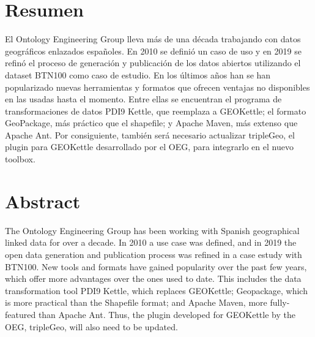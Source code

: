 \chapter*{Resumen}

El Ontology Engineering Group lleva más de una década trabajando con datos geográficos enlazados españoles. En
2010\cite{spanish} se definió un caso de uso y en 2019\cite{toolbox} se refinó el proceso de generación y
publicación de los datos abiertos utilizando el dataset BTN100 como caso de estudio. En los últimos años han se
han popularizado nuevas herramientas y formatos que ofrecen ventajas no disponibles en las usadas hasta el
momento. Entre ellas se encuentran el programa de transformaciones de datos PDI9 Kettle, que reemplaza a
GEOKettle; el formato GeoPackage, más práctico que el shapefile; y Apache Maven, más extenso que Apache Ant. Por
consiguiente, también será necesario actualizar tripleGeo, el plugin para GEOKettle desarrollado por el OEG,
para integrarlo en el nuevo toolbox. 

\newpage

\chapter*{Abstract}

The Ontology Engineering Group has been working with Spanish geographical linked data for over a decade. In
2010\cite{spanish} a use case was defined, and in 2019\cite{toolbox} the open data generation and publication
process was refined in a case estudy with BTN100. New tools and formats have gained popularity over the past few
years, which offer more advantages over the ones used to date. This includes the data transformation tool PDI9
Kettle, which replaces GEOKettle; Geopackage, which is more practical than the Shapefile format; and Apache
Maven, more fully-featured than Apache Ant. Thus, the plugin developed for GEOKettle by the OEG, tripleGeo, 
will also need to be updated.



